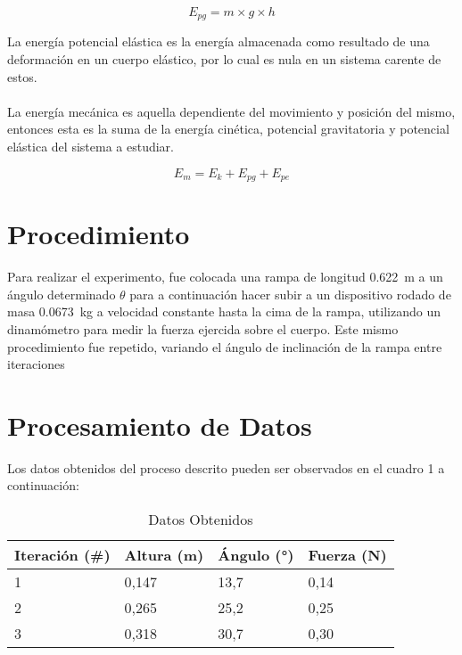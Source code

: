 \documentclass{article}
\begin{document}
\begin{equation}
E_{pg} = m \times g \times h
\end{equation}

La energía potencial elástica es la energía almacenada como resultado de una deformación en un cuerpo elástico, por lo cual es nula en un sistema carente de estos.
\\
\\
La energía mecánica es aquella dependiente del movimiento y posición del mismo, entonces esta es la suma de la energía cinética, potencial gravitatoria y potencial elástica del sistema a estudiar.

\begin{equation}
E_m = E_k + E_{pg} + E_{pe}
\label{equation:em}
\end{equation}

\section{Procedimiento}

Para realizar el experimento, fue colocada una rampa de longitud \qty{0,622}{m} a un ángulo determinado $\theta$ para a continuación hacer subir a un dispositivo rodado de masa \qty{0,0673}{kg} a velocidad constante hasta la cima de la rampa, utilizando un dinamómetro para medir la fuerza ejercida sobre el cuerpo. Este mismo procedimiento fue repetido, variando el ángulo de inclinación de la rampa entre iteraciones

\section{Procesamiento de Datos}

Los datos obtenidos del proceso descrito pueden ser observados en el cuadro 1 a continuación:

\begin{table}[H]
\centering
\begin{tabular}{|l|l|l|l|}
\hline
\rowcolor[HTML]{C0C0C0} 
Iteración (\#) & Altura (m) & Ángulo (°) & Fuerza (N) \\ \hline
1 & 0,147 & 13,7 & 0,14 \\ \hline
2 & 0,265 & 25,2 & 0,25 \\ \hline
3 & 0,318 & 30,7 & 0,30 \\ \hline
\end{tabular}
\caption{Datos Obtenidos}
\label{table:mediciones}
\end{table}
\end{document}

